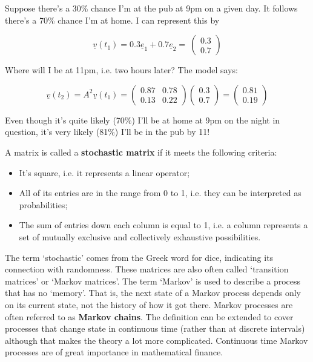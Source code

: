 \documentclass[oneside,english]{amsbook}
\numberwithin{section}{chapter}
\theoremstyle{plain}
\theoremstyle{definition}
\begin{document}
Suppose there's a 30\% chance I'm at the pub at 9pm on a given day. It
follows there's a 70\% chance I'm at home. I can represent this by

\[\underline{v}\left( t_{1} \right) = 0.3{\underline{e}}_{1} + 0.7{\underline{e}}_{2} = \ \begin{pmatrix}
	0.3 \\
	0.7
\end{pmatrix}\]

Where will I be at 11pm, i.e. two hours later? The model says:

\[{\underline{v}\left( t_{2} \right) = A^{2}\underline{v}\left( t_{1} \right)
}{= \begin{pmatrix}
		0.87 & 0.78 \\
		0.13 & 0.22
	\end{pmatrix}\begin{pmatrix}
		0.3 \\
		0.7
	\end{pmatrix}
}{= \begin{pmatrix}
		0.81 \\
		0.19
\end{pmatrix}}\]

Even though it's quite likely (70\%) I'll be at home at 9pm on the night
in question, it's very likely (81\%) I'll be in the pub by 11!

A matrix is called a \textbf{stochastic matrix} if it meets the
following criteria:

\begin{itemize}
	\item
	It's square, i.e. it represents a linear operator;
	\item
	All of its entries are in the range from 0 to 1, i.e. they can be
	interpreted as probabilities;
	\item
	The sum of entries down each column is equal to 1, i.e. a column
	represents a set of mutually exclusive and collectively exhaustive
	possibilities.
\end{itemize}

The term `stochastic' comes from the Greek word for dice, indicating
its connection with randomness. These matrices are also often called
`transition matrices' or `Markov matrices'. The term `Markov' is
used to describe a process that has no `memory'. That is, the next
state of a Markov process depends only on its current state, not the
history of how it got there. Markov processes are often referred to as
\textbf{Markov chains}. The definition can be extended to cover
processes that change state in continuous time (rather than at discrete
intervals) although that makes the theory a lot more complicated.
Continuous time Markov processes are of great importance in mathematical
finance.
\end{document}
